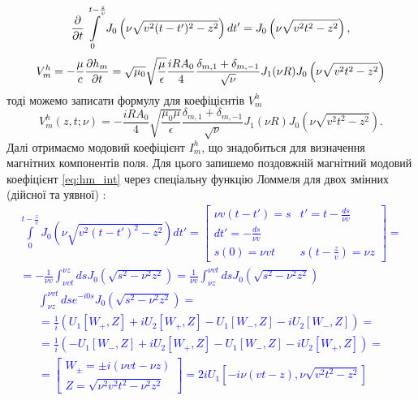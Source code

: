 %
\begin{equation*} \begin{aligned}
\frac{\partial }{\partial t} \int \limits_{0}^{t - \frac{z}{v}} 
J_0 \left( \nu \sqrt{v^2 (t-t')^2 - z^2} \right) dt' =
J_0 \left( \nu \sqrt{v^2 t^2 - z^2} \right),
\end{aligned} \end{equation*}
%
\textcolor{blue} { \begin{equation*} \begin{aligned}
V_m^h = - \frac{\mu}{c} \frac{\partial h_m}{\partial t} = 
\sqrt{\mu_0} \sqrt{\frac{\mu}{\epsilon}} \frac{iR A_0}{4} 
\frac{\delta_{m,1} + \delta_{m,-1}}{\sqrt{\nu}} J_1 (\nu R)
J_0 \left( \nu \sqrt{\mathit{v}^2 t^2 - z^2} \right)
\end{aligned} \end{equation*} }
%
тоді можемо записати формулу для коефіцієнтів $ V_m^h $
%
\begin{equation} \label{eq:vmh}
V_m^h (z, t; \nu) = - \frac{iR A_0}{4} \sqrt{\frac{\mu_0 \mu}{\epsilon}} 
\frac{\delta_{m,1} + \delta_{m,-1}}{\sqrt{\nu}} J_1 (\nu R)
J_0 \left( \nu \sqrt{\mathit{v}^2 t^2 - z^2} \right).
\end{equation}
%
Далі отримаємо модовий коефіцієнт $ I_m^h $, що знадобиться для визначення
магнітних компонентів поля. Для цього запишемо поздовжній магнітний модовий
коефіцієнт \eqref{eq:hm_int} через спеціальну функцію Ломмеля для двох 
змінних (дійсної та уявної) \cite{imp:Boersma1961}:
%
\textcolor{blue} { \begin{equation*} \begin{aligned}
\int \limits_{0}^{t - \frac{z}{\mathit{v}}} 
J_0 \left( \nu \sqrt{\mathit{v}^2 (t-t')^2 - z^2} 
\right) dt' = \left[ \begin{array}{cc} 
\nu \mathit{v} (t-t') = s & t' = t - \frac{ds}{\nu \mathit{v}} \\
dt' = -\frac{ds}{\nu \mathit{v}} & \\
s(0) = \nu \mathit{v} t & s \left( t - \frac{z}{\mathit{v}} \right) = \nu z
\end{array} \right] = \\ = - \frac{1}{\nu \mathit{v}} 
\int_{\nu \mathit{v} t}^{\nu z} ds 
J_0 (\sqrt{s^2 - \nu^2 z^2}) = \frac{1}{\nu \mathit{v}} 
\int_{\nu z}^{\nu \mathit{v} t} ds
J_0 (\sqrt{s^2 - \nu^2 z^2})
\end{aligned} \end{equation*} }
%
\textcolor{blue} { \begin{equation*} \begin{aligned}
\int_{\nu z}^{\nu \mathit{v} t} ds e^{-i0s} J_0 (\sqrt{s^2 - \nu^2 z^2}) = \\ 
= \frac{1}{i} (U_1[W_+,Z] + i U_2[W_+,Z] - U_1[W_-,Z] - i U_2[W_-,Z]) = \\
= \frac{1}{i} (-U_1[W_-,Z] + i U_2[W_+,Z] - U_1[W_-,Z] - i U_2[W_+,Z]) = \\
= \left[ \begin{array}{c} W_\pm = \pm i (\nu \mathit{v} t - \nu z) \\
Z = \sqrt{\nu^2 \mathit{v}^2 t^2 - \nu^2 z^2} \end{array} \right] = 
2i U_1 \left[ -i \nu (\mathit{v}t-z), \nu \sqrt{\mathit{v}^2 t^2-z^2} \right]
\end{aligned} \end{equation*} }
